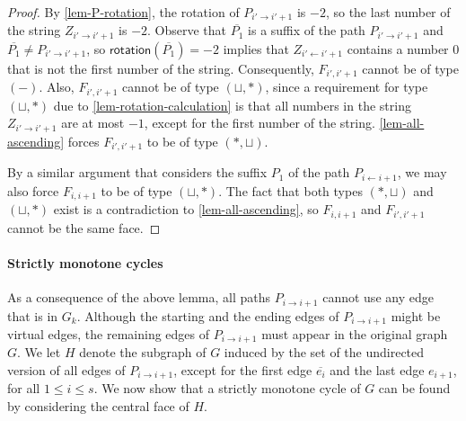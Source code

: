 \documentclass{article}\usepackage[a4paper,margin=20mm]{geometry}
\newcommand{\rotation}{\mathsf{rotation}}
\begin{document}
\begin{proof}
By \cref{lem-P-rotation}, the rotation of $P_{i' \rightarrow i'+1}$ is $-2$, so the last number of the string $Z_{i' \rightarrow i'+1}$ is $-2$.
Observe that $\overline{P_1}$ is a suffix of the path $P_{i' \rightarrow i'+1}$ and $\overline{P_1} \neq P_{i' \rightarrow i'+1}$, so $\rotation(\overline{P_1}) = -2$ implies that  
$Z_{i' \leftarrow i'+1}$ contains a number $0$ that is not the first number of the string. Consequently,  $F_{i',i'+1}$ cannot be of type $(-)$.
Also, $F_{i',i'+1}$  cannot be of type $(\sqcup,\ast)$, since a requirement for type $(\sqcup,\ast)$ due to \cref{lem-rotation-calculation} is that all numbers in the string  $Z_{i' \rightarrow i'+1}$ are at most $-1$, except for the first number of the string. \cref{lem-all-ascending} forces $F_{i',i'+1}$ to be of  type $(\ast,\sqcup)$. 

By a similar argument that considers the suffix $P_1$  of the path $P_{i \leftarrow i+1}$, we may also force $F_{i,i+1}$ to be of type $(\sqcup,\ast)$. The fact that both types $(\ast,\sqcup)$ and $(\sqcup,\ast)$ exist is a contradiction to \cref{lem-all-ascending}, so $F_{i,i+1}$ and $F_{i',i'+1}$ cannot be the same face.
\end{proof}

\paragraph{Strictly monotone cycles}
As a consequence of the above lemma, all paths $P_{i \rightarrow i+1}$ cannot use any edge that is in $G_{k}$. Although the starting and the ending edges of $P_{i \rightarrow i+1}$ might be virtual edges, the remaining edges of $P_{i \rightarrow i+1}$ must appear in the original graph $G$. We let $H$ denote the subgraph of $G$ induced by the set of the undirected version of all edges of $P_{i \rightarrow i+1}$, except for the first edge $\overline{e_i}$ and the last edge $e_{i+1}$, for all $1 \leq i \leq s$.  We now show that a strictly monotone cycle of $G$ can be found by considering the central face of $H$.
\end{document}
